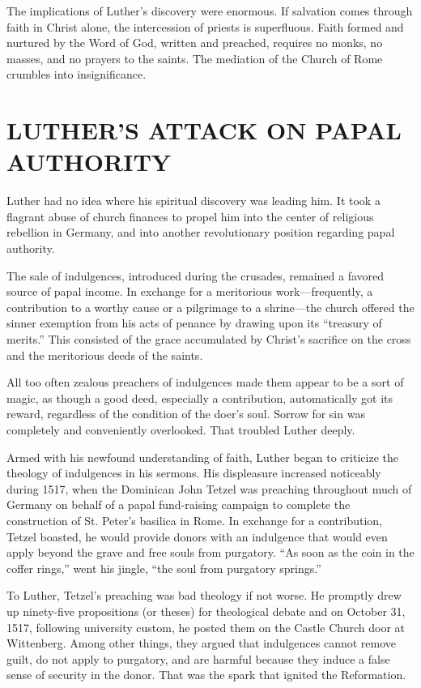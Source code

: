 The implications of Luther’s discovery were enormous. If salvation comes through faith in Christ
alone, the intercession of priests is superfluous. Faith formed and nurtured by the Word of God,
written and preached, requires no monks, no masses, and no prayers to the saints. The mediation of
the Church of Rome crumbles into insignificance.

\section{LUTHER’S ATTACK ON PAPAL AUTHORITY}

Luther had no idea where his spiritual discovery was leading him. It took a flagrant abuse of church
finances to propel him into the center of religious rebellion in Germany, and into another
revolutionary position regarding papal authority.

The sale of indulgences, introduced during the crusades, remained a favored source of papal income.
In exchange for a meritorious work—frequently, a contribution to a worthy cause or a pilgrimage to a
shrine—the church offered the sinner exemption from his acts of penance by drawing upon its
“treasury of merits.” This consisted of the grace accumulated by Christ’s sacrifice on the cross and
the meritorious deeds of the saints.

All too often zealous preachers of indulgences made them appear to be a sort of magic, as though a
good deed, especially a contribution, automatically got its reward, regardless of the condition of
the doer’s soul. Sorrow for sin was completely and conveniently overlooked. That troubled Luther
deeply.

Armed with his newfound understanding of faith, Luther began to criticize the theology of
indulgences in his sermons. His displeasure increased noticeably during 1517, when the Dominican
John Tetzel was preaching throughout much of Germany on behalf of a papal fund-raising campaign to
complete the construction of St. Peter’s basilica in Rome. In exchange for a contribution, Tetzel
boasted, he would provide donors with an indulgence that would even apply beyond the grave and free
souls from purgatory. “As soon as the coin in the coffer rings,” went his jingle, “the soul from
purgatory springs.”

To Luther, Tetzel’s preaching was bad theology if not worse. He promptly drew up ninety-five
propositions (or theses) for theological debate and on October 31, 1517, following university
custom, he posted them on the Castle Church door at Wittenberg. Among other things, they argued that
indulgences cannot remove guilt, do not apply to purgatory, and are harmful because they induce a
false sense of security in the donor. That was the spark that ignited the Reformation.

